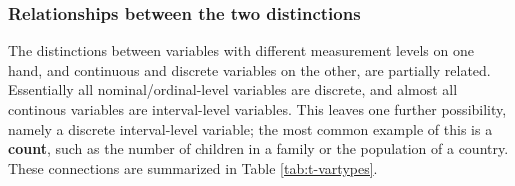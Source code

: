 \documentclass[11pt,a4paper,openany]{book}
\begin{document}
\subsubsection*{Relationships between the two
distinctions}\label{relationships-between-the-two-distinctions}

The distinctions between variables with different measurement levels on
one hand, and continuous and discrete variables on the other, are
partially related. Essentially all nominal/ordinal-level variables are
discrete, and almost all continous variables are interval-level
variables. This leaves one further possibility, namely a discrete
interval-level variable; the most common example of this is a
\textbf{count}, such as the number of children in a family or the
population of a country. These connections are summarized in Table
\ref{tab:t-vartypes}.
\end{document}
